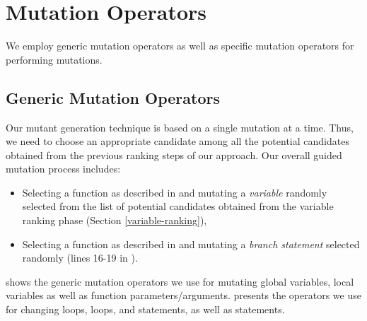 \section{Mutation Operators} \label{Sec:mutation-process}
We employ generic mutation operators as well as \javascript specific mutation operators for performing mutations. 

\subsection{Generic Mutation Operators}
Our mutant generation technique is based on a single mutation at a time. Thus, we need to choose an appropriate candidate among all the potential candidates obtained from the previous ranking steps of our approach.
Our overall guided mutation process includes:
\begin{itemize}
\item Selecting a function as described in  and mutating a \emph{variable} randomly selected from the list of 
potential candidates obtained from the variable ranking phase (Section \ref{variable-ranking}), 

\item Selecting a function as described in  and mutating a  \emph{branch statement} selected randomly (lines 16-19 in ).

\end{itemize}

 shows the generic mutation operators we use for mutating global variables, local variables as well as function parameters/arguments.
 presents the operators we use for changing  loops,  loops,  and  statements, as well as  statements.




